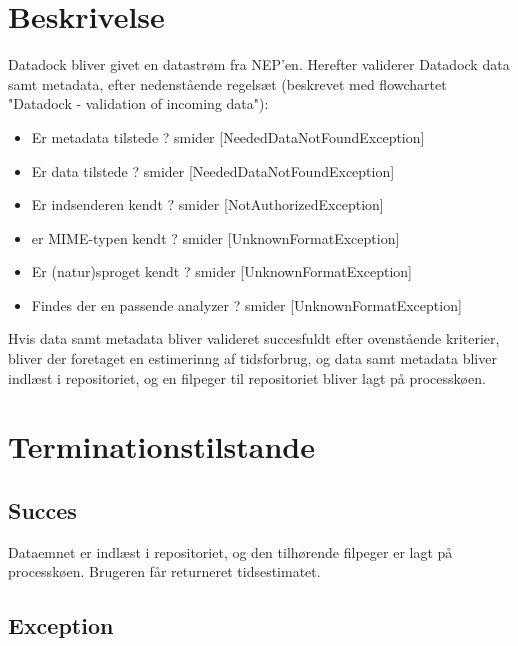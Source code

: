 \documentclass{article}
\begin{document}
\section{Beskrivelse}
Datadock bliver givet en datastrøm fra NEP'en.  Herefter validerer
Datadock data samt metadata, efter nedenstående regelsæt (beskrevet
med flowchartet "Datadock - validation of incoming data"):

\begin{itemize}
\item Er metadata tilstede ?
  smider [NeededDataNotFoundException]
\item Er data tilstede ?
  smider [NeededDataNotFoundException]
\item Er indsenderen kendt ?
  smider [NotAuthorizedException]
\item er MIME-typen kendt ?
  smider [UnknownFormatException]
\item Er (natur)sproget kendt ?
  smider [UnknownFormatException]
\item Findes der en passende analyzer ?
  smider [UnknownFormatException]
\end{itemize}

Hvis data samt metadata bliver valideret succesfuldt efter ovenstående kriterier, bliver der foretaget en estimerinng af tidsforbrug, og data samt metadata bliver indlæst i repositoriet, og en filpeger til repositoriet bliver lagt på processkøen.

\section{Terminationstilstande}

\subsection{Succes}
Dataemnet er indlæst i repositoriet, og den tilhørende filpeger er lagt på processkøen.
Brugeren får returneret tidsestimatet.


\subsection{Exception}
\end{document}
